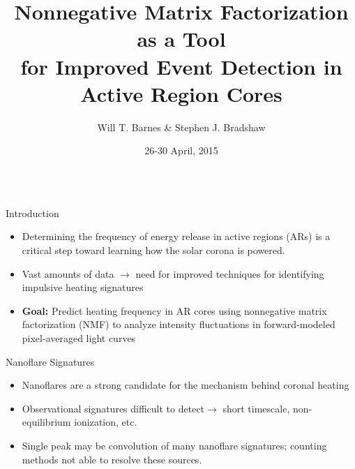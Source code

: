 \documentclass[final]{beamer}
\title[NMF in Active Regions]{Nonnegative Matrix Factorization as a Tool\\for Improved Event Detection in Active Region Cores}
\author[Barnes \& Bradshaw]{Will T. Barnes \& Stephen J. Bradshaw}
\institute[Rice University]{Department of Physics and Astronomy, Rice University}
\date{26-30 April, 2015}
\begin{document}
\begin{frame}{} 
    \begin{columns}[t]
		\hfill
		\hfill
      \begin{column}{.32\linewidth}
        \begin{block}{Introduction}
          \begin{itemize}
			  \item Determining the \alert{frequency of energy release} in active regions (ARs) is a critical step toward learning how the solar corona is powered.
			  \item Vast amounts of data $\rightarrow$ need for improved techniques for identifying impulsive heating signatures
			  \item \textbf{Goal:} Predict heating frequency in AR cores using \alert{nonnegative matrix factorization (NMF)} to analyze intensity fluctuations in forward-modeled pixel-averaged light curves
		  \end{itemize}
        \end{block}
		\begin{block}{Nanoflare Signatures}
			\begin{itemize}
				\item Nanoflares \citep{parker_nanoflares_1988} are a strong candidate for the mechanism behind coronal heating
				\item Observational signatures difficult to detect$\rightarrow$ short timescale, non-equilibrium ionization, etc.
				\item \alert{Single peak may be convolution of many nanoflare signatures;} counting methods not able to resolve these sources.
			\end{itemize}
			\begin{figure}
\end{figure}
\end{block}
\end{column}
\end{columns}
\end{frame}
\end{document}
